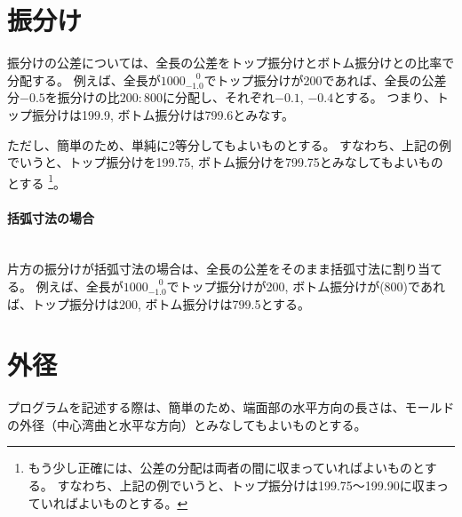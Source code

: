 \section{振分け}
振分けの公差については、全長の公差をトップ振分けとボトム振分けとの比率で分配する。
例えば、全長が$1000^{\phantom +0}_{-1.0}$でトップ振分けが200であれば、全長の公差分$-0.5$を振分けの比$200:800$に分配し、それぞれ$-0.1$, $-0.4$とする。
つまり、トップ振分けは199.9, ボトム振分けは799.6とみなす。

ただし、簡単のため、単純に2等分してもよいものとする。
すなわち、上記の例でいうと、トップ振分けを199.75, ボトム振分けを799.75とみなしてもよいものとする
\footnote{もう少し正確には、公差の分配は両者の間に収まっていればよいものとする。
すなわち、上記の例でいうと、トップ振分けは199.75～199.90に収まっていればよいものとする。}。

\paragraph{括弧寸法の場合}　\\
片方の振分けが括弧寸法の場合は、全長の公差をそのまま括弧寸法に割り当てる。
例えば、全長が$1000^{\phantom +0}_{-1.0}$でトップ振分けが200, ボトム振分けが(800)であれば、トップ振分けは200, ボトム振分けは799.5とする。




\section{外径}
\label{app:gaikei}
プログラムを記述する際は、簡単のため、端面部の水平方向の長さは、モールドの外径（中心湾曲と水平な方向）とみなしてもよいものとする。

